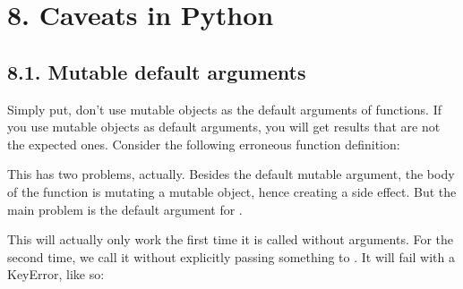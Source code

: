 \documentclass[a4paper,10pt,english]{sphinxmanual}
\begin{document}
\section{8. Caveats in Python}
\label{\detokenize{chapters/2_pythonic_code/index:caveats-in-python}}

\subsection{8.1. Mutable default arguments}
\label{\detokenize{chapters/2_pythonic_code/index:mutable-default-arguments}}
Simply put, don’t use mutable objects as the default arguments of functions. If you use mutable objects as default
arguments, you will get results that are not the expected ones. Consider the following erroneous function definition:

\begin{sphinxVerbatim}[commandchars=\\\{\}]
       
      
      

     
\end{sphinxVerbatim}

This has two problems, actually. Besides the default mutable argument, the body of the function is mutating a mutable
object, hence creating a side effect. But the main problem is the default argument for .

This will actually only work the first time it is called without arguments. For the second time, we call it without
explicitly passing something to . It will fail with a KeyError, like so:
\end{document}
